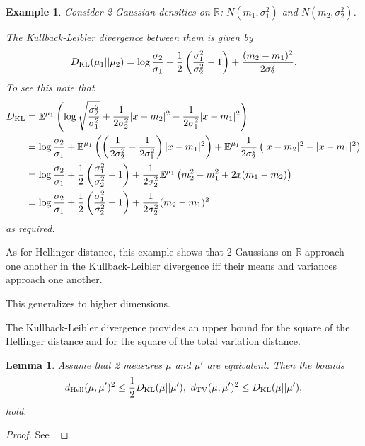 \documentclass[oneside,11pt]{book}
\numberwithin{equation}{section}
\newtheorem{lemma}{Lemma}[section]
\newtheorem{example}{Example}[section]
\begin{document}
\begin{example}
    Consider 2 Gaussian densities on $\mathbb{R}$: $N(m_1,\sigma_1^2)$ and $N(m_2,\sigma_2^2)$.
    
    The Kullback-Leibler divergence between them is given by
    \begin{align*}
        D_{\rm KL}(\mu_1||\mu_2) = \log\frac{\sigma_2}{\sigma_1} + \frac{1}{2}\left(\frac{\sigma_1^2}{\sigma_2^2} - 1\right) + \frac{(m_2 - m_1)^2}{2\sigma_2^2}.
    \end{align*}
    To see this note that
    \begin{align*}
        D_{\rm KL} &= \mathbb{E}^{\mu_1}\left(\log\sqrt{\frac{\sigma_2^2}{\sigma_1^2}} + \frac{1}{2\sigma_2^2}|x - m_2|^2 - \frac{1}{2\sigma_1^2}|x - m_1|^2\right)\\
        &= \log\frac{\sigma_2}{\sigma_1} + \mathbb{E}^{\mu_1}\left(\left(\frac{1}{2\sigma_2^2} - \frac{1}{2\sigma_1^2}\right)|x - m_1|^2\right) + \mathbb{E}^{\mu_1}\frac{1}{2\sigma_2^2}\left(|x - m_2|^2 - |x - m_1|^2\right)\\
        &= \log\frac{\sigma_2}{\sigma_1} + \frac{1}{2}\left(\frac{\sigma_1^2}{\sigma_2^2} - 1\right) + \frac{1}{2\sigma_2^2}\mathbb{E}^{\mu_1}\left(m_2^2 - m_1^2 + 2x(m_1 - m_2)\right)\\
        &= \log\frac{\sigma_2}{\sigma_1} + \frac{1}{2}\left(\frac{\sigma_1^2}{\sigma_2^2} - 1\right) + \frac{1}{2\sigma_2^2}(m_2 - m_1)^2
    \end{align*}
    as required.
\end{example}
As for Hellinger distance, this example shows that 2 Gaussians on $\mathbb{R}$ approach one another in the Kullback-Leibler divergence iff their means and variances approach one another.

This generalizes to higher dimensions.

The Kullback-Leibler divergence provides an upper bound for the square of the Hellinger distance and for the square of the total variation distance.

\begin{lemma}
    Assume that 2 measures $\mu$ and $\mu'$ are equivalent. Then the bounds
    \begin{align*}
        d_{\rm Hell}(\mu,\mu')^2\le\frac{1}{2}D_{\rm KL}(\mu||\mu'),\ d_{\rm TV}(\mu,\mu')^2\le D_{\rm KL}(\mu||\mu'),
    \end{align*}
    hold.
\end{lemma}

\begin{proof}
    See \cite[p. 412]{Dashti_Stuart2017}.
\end{proof}


\printbibliography[heading=bibintoc]
\end{document}
